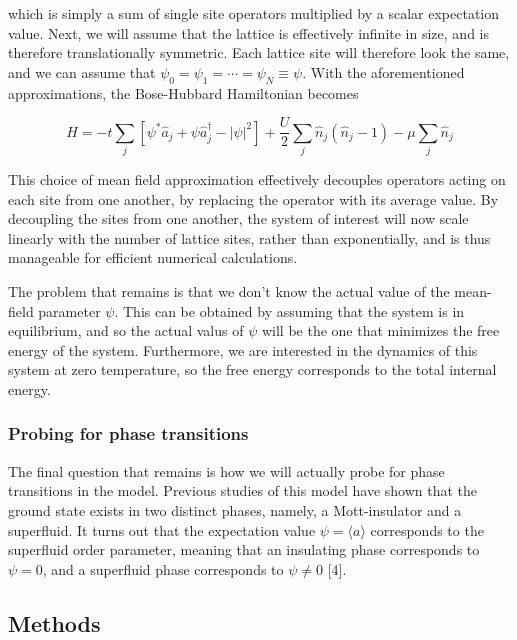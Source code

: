 \documentclass[11pt]{article}
\begin{document}
which is simply a sum of single site operators multiplied by a scalar
expectation value. Next, we will assume that the lattice is effectively
infinite in size, and is therefore translationally symmetric. Each
lattice site will therefore look the same, and we can assume that
\(\psi_0 = \psi_1 = \cdots = \psi_N \equiv \psi\). With the
aforementioned approximations, the Bose-Hubbard Hamiltonian becomes

\[H = -t \sum_j  \left[ \psi^* \hat a_j + \psi \hat a_j^\dagger - |\psi|^2 \right] + \frac U2 \sum_{j} \hat n_{j} \left( \hat n_{j} -1 \right) -\mu \sum_{j} \hat n_{j}\]

This choice of mean field approximation effectively decouples operators
acting on each site from one another, by replacing the operator with its
average value. By decoupling the sites from one another, the system of
interest will now scale linearly with the number of lattice sites,
rather than exponentially, and is thus manageable for efficient
numerical calculations.

The problem that remains is that we don't know the actual value of the
mean-field parameter \(\psi\). This can be obtained by assuming that the
system is in equilibrium, and so the actual valus of \(\psi\) will be
the one that minimizes the free energy of the system. Furthermore, we
are interested in the dynamics of this system at zero temperature, so
the free energy corresponds to the total internal energy.

    \hypertarget{probing-for-phase-transitions}{%
\subsubsection{Probing for phase
transitions}\label{probing-for-phase-transitions}}

    The final question that remains is how we will actually probe for phase
transitions in the model. Previous studies of this model have shown that
the ground state exists in two distinct phases, namely, a Mott-insulator
and a superfluid. It turns out that the expectation value
\(\psi = \langle a \rangle\) corresponds to the superfluid order
parameter, meaning that an insulating phase corresponds to \(\psi = 0\),
and a superfluid phase corresponds to \(\psi \neq 0\) {[}4{]}.

    \hypertarget{methods}{%
\subsection{Methods}\label{methods}}
\end{document}
